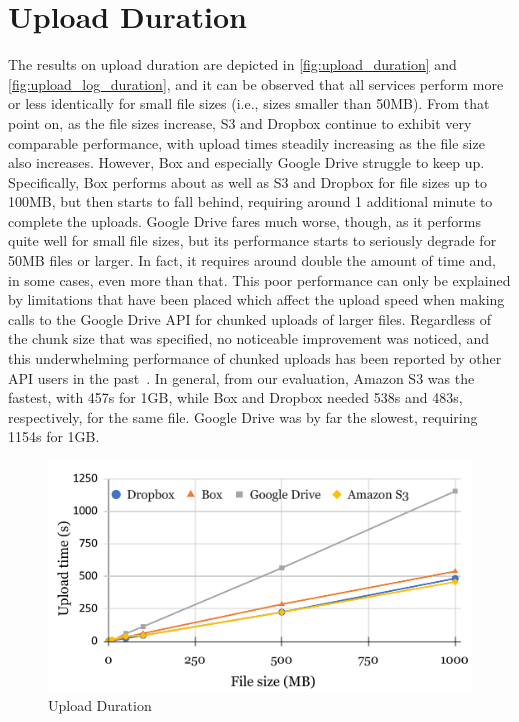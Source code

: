\section{Upload Duration}
The results on upload duration are depicted in \autoref{fig:upload_duration} and \autoref{fig:upload_log_duration}, and it can be observed that all services perform more or less identically for small file sizes (i.e., sizes smaller than 50MB). From that point on,  as the file sizes increase, S3 and Dropbox continue to exhibit very comparable performance, with upload times steadily increasing as the file size also increases.  However, Box and especially Google Drive struggle to keep up. Specifically, Box performs about as well as S3 and Dropbox for file sizes up to 100MB, but then starts to fall behind, requiring around 1 additional minute to complete the uploads. Google Drive fares much worse, though, as it performs quite well for small file sizes, but its performance starts to seriously degrade for 50MB files or larger. In fact, it requires around double the amount of time and, in some cases, even more than that. This poor performance can only be explained by limitations that have been placed which affect the  upload speed when making calls to the Google Drive API for chunked uploads of larger files. Regardless of the chunk size that was specified, no noticeable improvement was noticed, and this underwhelming performance of chunked uploads has been reported by other API users in the past~\cite{drive_chunked_performance}. In general, from our evaluation, Amazon S3 was the fastest, with 457s for 1GB, while Box and Dropbox needed 538s and 483s, respectively, for the same file. Google Drive was by far the slowest, requiring 1154s for 1GB.

\begin{figure} []
    \centering
    \includegraphics[scale=0.6]{images/upload_chart}
    \caption{\label{fig:upload_duration}Upload Duration}
\end{figure}

